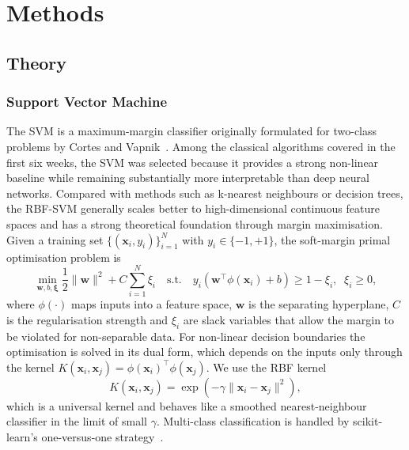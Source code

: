 \documentclass[../main.tex]{subfiles}
\begin{document}
\section{Methods}\label{section.3}

\subsection{Theory}

\subsubsection{Support Vector Machine}
\noindent
The \gls{SVM} is a maximum-margin classifier originally formulated for
two-class problems by Cortes and Vapnik~\cite{cortes1995svm}. Among the
classical algorithms covered in the first six weeks, the \gls{SVM} was
selected because it provides a strong non-linear baseline while remaining
substantially more interpretable than deep neural networks. Compared with
methods such as k-nearest neighbours or decision trees, the \gls{RBF}-SVM
generally scales better to high-dimensional continuous feature spaces and
has a strong theoretical foundation through margin maximisation. Given a
training set $\{(\bm{x}_{i}, y_{i})\}_{i=1}^{N}$ with
$y_{i} \in \{-1, +1\}$, the soft-margin primal optimisation problem is
\begin{equation}
    \min_{\bm{w}, b, \bm{\xi}}
        \frac{1}{2}\lVert \bm{w} \rVert^{2}
        + C \sum_{i=1}^{N} \xi_{i}
    \quad \text{s.t.} \quad
        y_{i}(\bm{w}^{\top} \phi(\bm{x}_{i}) + b) \geq 1 - \xi_{i},
        \;\; \xi_{i} \geq 0,
    \label{eq.svmprimal}
\end{equation}
where $\phi(\cdot)$ maps inputs into a feature space, $\bm{w}$ is the
separating hyperplane, $C$ is the regularisation strength and $\xi_{i}$ are
slack variables that allow the margin to be violated for non-separable data.
For non-linear decision boundaries the optimisation is solved in its dual
form, which depends on the inputs only through the kernel
$K(\bm{x}_{i}, \bm{x}_{j}) =
\phi(\bm{x}_{i})^{\top}\phi(\bm{x}_{j})$.
We use the \gls{RBF} kernel
\[
K(\bm{x}_{i}, \bm{x}_{j})
=
\exp\left(
-\gamma \lVert \bm{x}_{i} - \bm{x}_{j} \rVert^{2}
\right),
\]
which is a universal kernel and behaves like a smoothed nearest-neighbour
classifier in the limit of small $\gamma$. Multi-class classification is
handled by scikit-learn's one-versus-one
strategy~\cite{pedregosa2011sklearn}.
\end{document}
